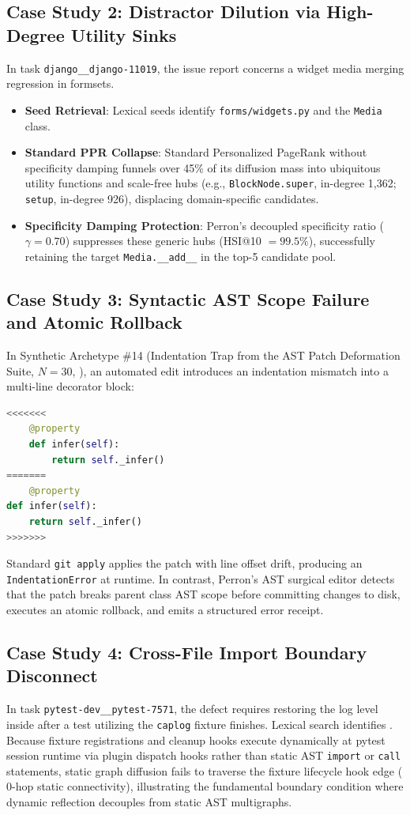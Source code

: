 \documentclass[10pt]{article}
\begin{document}
\subsection{Case Study 2: Distractor Dilution via High-Degree Utility Sinks}
In task \texttt{django\_\_django-11019}, the issue report concerns a widget media merging regression in formsets.
\begin{itemize}[noitemsep,topsep=2pt,parsep=0pt,partopsep=0pt]
    \item \textbf{Seed Retrieval}: Lexical seeds identify \texttt{forms/widgets.py} and the \texttt{Media} class.
    \item \textbf{Standard PPR Collapse}: Standard Personalized PageRank without specificity damping funnels over 45\% of its diffusion mass into ubiquitous utility functions and scale-free hubs (e.g., \texttt{BlockNode.super}, in-degree 1,362; \texttt{setup}, in-degree 926), displacing domain-specific candidates.
    \item \textbf{Specificity Damping Protection}: Perron's decoupled specificity ratio ($\gamma=0.70$) suppresses these generic hubs (HSI@10 $= 99.5\%$), successfully retaining the target \texttt{Media.\_\_add\_\_} in the top-5 candidate pool.
\end{itemize}

\subsection{Case Study 3: Syntactic AST Scope Failure and Atomic Rollback}
In Synthetic Archetype \#14 (Indentation Trap from the AST Patch Deformation Suite, $N=30$, ), an automated edit introduces an indentation mismatch into a multi-line decorator block:
\begin{lstlisting}[language=Python,basicstyle=\ttfamily\scriptsize]
<<<<<<<
    @property
    def infer(self):
        return self._infer()
=======
    @property
def infer(self):
    return self._infer()
>>>>>>>
\end{lstlisting}
Standard \texttt{git apply} applies the patch with line offset drift, producing an \texttt{IndentationError} at runtime. In contrast, Perron's AST surgical editor detects that the patch breaks parent class AST scope before committing changes to disk, executes an atomic rollback, and emits a structured error receipt.

\subsection{Case Study 4: Cross-File Import Boundary Disconnect}
In task \texttt{pytest-dev\_\_pytest-7571}, the defect requires restoring the log level inside  after a test utilizing the \texttt{caplog} fixture finishes. Lexical search identifies . Because fixture registrations and cleanup hooks execute dynamically at pytest session runtime via plugin dispatch hooks rather than static AST \texttt{import} or \texttt{call} statements, static graph diffusion fails to traverse the fixture lifecycle hook edge ($0$-hop static connectivity), illustrating the fundamental boundary condition where dynamic reflection decouples from static AST multigraphs.
\end{document}
